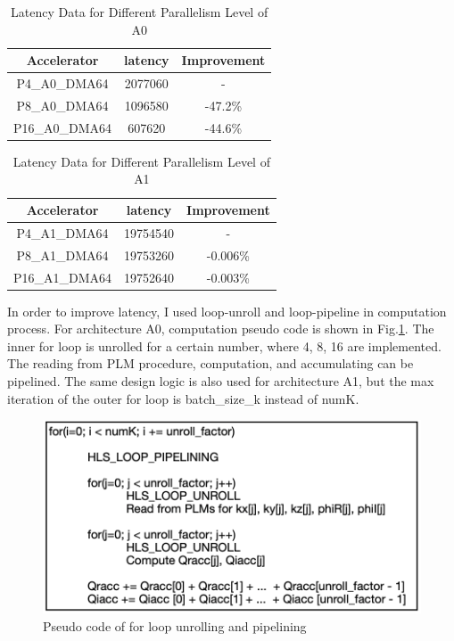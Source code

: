 \documentclass{sig-alternate}
\begin{document}
\begin{table}[ht!]
    \centering
    \begin{tabular}{c|c|c}
    \hline
    Accelerator & latency & Improvement \\
    \hline
    P4\_A0\_DMA64  &    2077060   & - \\
    P8\_A0\_DMA64  &    1096580	  &  -47.2\% \\
    P16\_A0\_DMA64  &   607620    &  -44.6\% \\
    \hline
    \end{tabular}
    \caption{Latency Data for Different Parallelism Level of A0}
    \label{tab-6}
\end{table}

\begin{table}[ht!]
    \centering
    \begin{tabular}{c|c|c}
    \hline
    Accelerator & latency & Improvement \\
    \hline
    P4\_A1\_DMA64  &    19754540    & - \\
    P8\_A1\_DMA64  &    19753260	  &  -0.006\% \\
    P16\_A1\_DMA64  &   19752640    &  -0.003\% \\
    \hline
    \end{tabular}
    \caption{Latency Data for Different Parallelism Level of A1}
    \label{tab-7}
\end{table}

In order to improve latency, I used loop-unroll and loop-pipeline in computation process. For architecture A0, computation pseudo code is shown in Fig.\ref{fig-4}. The inner for loop is unrolled for a certain number, where 4, 8, 16 are implemented. The reading from PLM procedure, computation, and accumulating can be pipelined. The same design logic is also used for architecture A1, but the max iteration of the outer for loop is batch\_size\_k instead of numK.

\begin{figure}[h!]
    \centering
    \includegraphics[width=0.85\columnwidth]{figure/pseudo code.png}
    \caption{Pseudo code of for loop unrolling and pipelining}
    \label{fig-4}
\end{figure}
\end{document}
